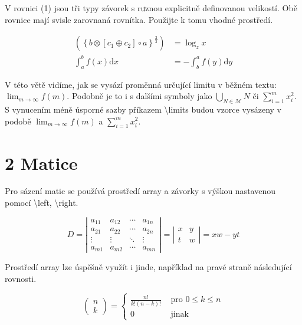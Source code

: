 \documentclass[10pt]{article}
\begin{document}
V rovnici (1) jsou tři typy závorek s rưznou explicitně definovanou velikostí. Obě rovnice mají svisle zarovnaná rovnítka. Použijte k tomu vhodné prostředí.


\begin{align*}
\left(\left\{b \otimes\left[c_{1} \oplus c_{2}\right] \circ a\right\}^{\frac{2}{3}}\right) & =\log _{z} x  \tag{1}\\
\int_{a}^{b} f(x) \mathrm{d} x & =-\int_{b}^{a} f(y) \mathrm{d} y \tag{2}
\end{align*}


V této větě vidíme, jak se vysází proměnná určující limitu v běžném textu: $\lim _{m \rightarrow \infty} f(m)$. Podobně je to i s dalšími symboly jako $\bigcup_{N \in \mathcal{M}} N$ či $\sum_{i=1}^{m} x_{i}^{2}$. S vynucením méně úsporné sazby příkazem \textbackslash limits budou vzorce vysázeny v podobě $\lim _{m \rightarrow \infty} f(m)$ a $\sum_{i=1}^{m} x_{i}^{2}$.

\section*{2 Matice}
Pro sázení matic se používá prostředí array a závorky s výškou nastavenou pomocí \textbackslash left, \textbackslash right.

$$
D=\left|\begin{array}{cccc}
a_{11} & a_{12} & \cdots & a_{1 n} \\
a_{21} & a_{22} & \cdots & a_{2 n} \\
\vdots & \vdots & \ddots & \vdots \\
a_{m 1} & a_{m 2} & \cdots & a_{m n}
\end{array}\right|=\left|\begin{array}{cc}
x & y \\
t & w
\end{array}\right|=x w-y t
$$

Prostředí array lze úspěšně využít i jinde, například na pravé straně následující rovnosti.

$$
\left(\begin{array}{l}
n \\
k
\end{array}\right)= \begin{cases}\frac{n !}{k !(n-k) !} & \text { pro } 0 \leq k \leq n \\
0 & \text { jinak }\end{cases}
$$
\end{document}
